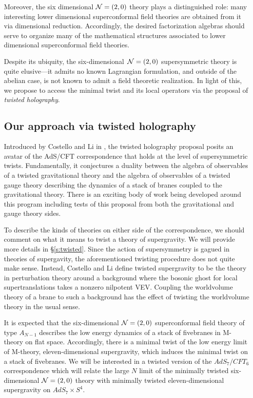 Moreover, the six dimensional $\mathcal N = (2,0)$ theory plays a distinguished role: many interesting lower dimensional superconformal field theories are obtained from it via dimensional reduction. Accordingly, the desired factorization algebras should serve to organize many of the mathematical structures associated to lower dimensional superconformal field theories.


Despite its ubiquity, the six-dimensional~$\mathcal N=(2,0)$ supersymmetric theory is quite elusive---it admits no known Lagrangian formulation, and outside of the abelian case, is not known to admit a field theoretic realization.
In light of this, we propose to access the minimal twist and its local operators via the proposal of \textit{twisted holography}.

\subsection{Our approach via twisted holography}
Introduced by Costello and Li in \cite{CLsugra}, the twisted holography proposal posits an avatar of the AdS/CFT correspondence that holds at the level of supersymmetric twists.
Fundamentally, it conjectures a duality between the algebra of observables of a twisted gravitational theory and the algebra of observables of a twisted gauge theory describing the dynamics of a stack of branes coupled to the gravitational theory. There is an exciting body of work being developed around this program including tests of this proposal from both the gravitational and gauge theory sides.

To describe the kinds of theories on either side of the correspondence, we should comment on what it means to twist a theory of supergravity. We will provide more details in \S \ref{s:twisted}. Since the action of supersymmetry is gagued in theories of supergavity, the aforementioned twisting procedure does not quite make sense. Instead, Costello and Li define twisted supergravity to be the theory in perturbation theory around a background where the bosonic ghost for local supertranslations takes a nonzero nilpotent VEV. Coupling the worldvolume theory of a brane to such a background has the effect of twisting the worldvolume theory in the usual sense.

It is expected that the six-dimensional $\mathcal N=(2,0)$ superconformal field theory of type $A_{N-1}$ describes the low energy dynamics of a stack of fivebranes in M-theory on flat space. Accordingly, there is a minimal twist of the low energy limit of M-theory, eleven-dimensional supergravity, which induces the minimal twist on a stack of fivebranes. We will be interested in a twisted version of the $AdS_{7}/CFT_{6}$ correspondence which will relate the large $N$ limit of the minimally twisted six-dimensional $\mathcal N=(2,0)$ theory with minimally twisted eleven-dimensional supergravity on $AdS_{7}\times S^{4}$.

